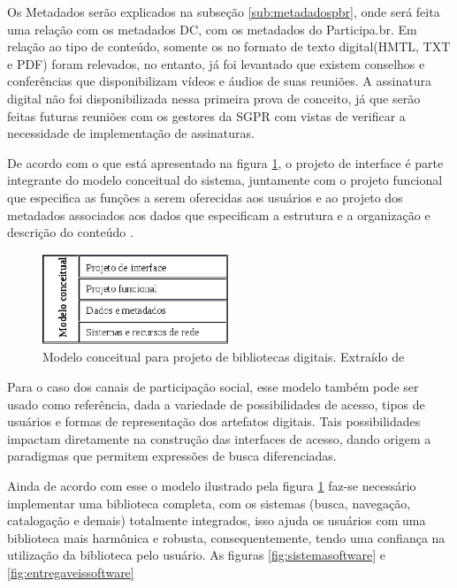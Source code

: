 Os Metadados serão explicados na subseção \ref{sub:metadadospbr}, onde será feita uma relação com os metadados DC, com os metadados do Participa.br. Em relação ao tipo de conteúdo, somente os no formato de texto digital(HMTL, TXT e PDF) foram relevados, no entanto, já foi levantado que existem conselhos e conferências que disponibilizam vídeos e áudios de suas reuniões. A assinatura digital não foi disponibilizada nessa primeira prova de conceito, já que serão feitas futuras reuniões com os gestores da SGPR com vistas de verificar a necessidade de implementação de assinaturas.

De acordo com o que está apresentado na figura \ref{fig:modelbibdigital}, o projeto de interface é parte integrante do modelo conceitual do sistema, juntamente com o projeto funcional que especifica as funções a serem oferecidas aos usuários e ao projeto dos metadados associados aos dados que especificam a estrutura e a organização e descrição do conteúdo \cite[pp. 143--145]{arms2000digital}\cite[pp. 190]{ferreira2006interface}.

\graphicspath{{figuras/}}
\begin{figure}[H]
\centering
\includegraphics[width=0.5\textwidth]{modelo_biblioteca}
\caption[Modelo conceitual para projeto de bibliotecas digitais]{Modelo conceitual para projeto de bibliotecas digitais. Extraído de \cite[p. 144]{arms2000digital}}
\label{fig:modelbibdigital}
\end{figure}

Para o caso dos canais de participação social, esse modelo também pode ser usado como referência, dada a variedade de possibilidades de acesso, tipos de usuários e formas de representação dos artefatos digitais. Tais possibilidades impactam diretamente na construção das interfaces de acesso, dando origem a paradigmas que permitem expressões de busca diferenciadas.

Ainda de acordo com esse o modelo ilustrado pela figura \ref{fig:modelbibdigital} faz-se necessário implementar uma biblioteca completa, com os sistemas (busca, navegação, catalogação e demais) totalmente integrados, isso ajuda os usuários com uma biblioteca mais harmônica e robusta, consequentemente, tendo uma confiança na utilização da biblioteca pelo usuário. As figuras \ref{fig:sistemasoftware}  e \ref{fig:entregaveissoftware}

